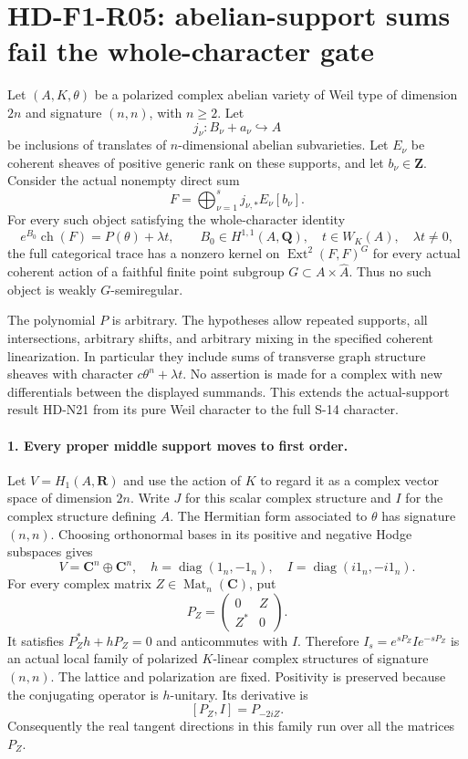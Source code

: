 \section{HD-F1-R05: abelian-support sums fail the whole-character gate}
\label{sec:f1-abelian-support}

Let $(A,K,\theta)$ be a polarized complex abelian variety of
Weil type of dimension $2n$ and signature $(n,n)$, with $n\ge2$.
Let
\[
 j_\nu:B_\nu+a_\nu\hookrightarrow A
\]
be inclusions of translates of $n$-dimensional abelian
subvarieties. Let $E_\nu$ be coherent sheaves of positive
generic rank on these supports, and let $b_\nu\in\mathbf Z$.
Consider the actual nonempty direct sum
\[
 F=\bigoplus_{\nu=1}^s j_{\nu,*}E_\nu[b_\nu].
 \tag{F1R5.1}
\]
For every such object satisfying the whole-character identity
\[
 e^{B_0}\operatorname{ch}(F)
       =P(\theta)+\lambda t,
 \qquad B_0\in H^{1,1}(A,\mathbf Q),\quad
 t\in W_K(A),\quad\lambda t\ne0,
 \tag{F1R5.2}
\]
the full categorical trace has a nonzero kernel on
$\operatorname{Ext}^2(F,F)^G$ for every actual coherent action
of a faithful finite point subgroup $G\subset A\times\widehat A$.
Thus no such object is weakly $G$-semiregular.

The polynomial $P$ is arbitrary. The hypotheses allow repeated
supports, all intersections, arbitrary shifts, and arbitrary
mixing in the specified coherent linearization. In particular
they include sums of transverse graph structure sheaves with
character $c\theta^n+\lambda t$. No assertion is made for a
complex with new differentials between the displayed summands.
This extends the actual-support result HD-N21 from its pure
Weil character to the full S-14 character.

\paragraph{1. Every proper middle support moves to first order.}
Let $V=H_1(A,\mathbf R)$ and use the action of $K$ to regard
it as a complex vector space of dimension $2n$. Write $J$ for
this scalar complex structure and $I$ for the complex structure
defining $A$. The Hermitian form associated to $\theta$ has
signature $(n,n)$. Choosing orthonormal bases in its positive
and negative Hodge subspaces gives
\[
 V=\mathbf C^n\oplus\mathbf C^n,\quad
 h=\operatorname{diag}(1_n,-1_n),\quad
 I=\operatorname{diag}(i1_n,-i1_n).
 \tag{F1R5.3}
\]
For every complex matrix $Z\in\operatorname{Mat}_n(\mathbf C)$,
put
\[
 P_Z=\begin{pmatrix}0&Z\\Z^*&0\end{pmatrix}.
 \tag{F1R5.4}
\]
It satisfies $P_Z^*h+hP_Z=0$ and anticommutes with $I$.
Therefore $I_s=e^{sP_Z}Ie^{-sP_Z}$ is an actual local family
of polarized $K$-linear complex structures of signature $(n,n)$.
The lattice and polarization are fixed. Positivity is preserved
because the conjugating operator is $h$-unitary. Its derivative
is
\[
 [P_Z,I]=P_{-2iZ}.
 \tag{F1R5.5}
\]
Consequently the real tangent directions in this family run
over all the matrices $P_Z$.

